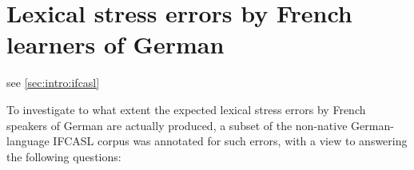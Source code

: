 %
%
\chapter{Lexical stress errors by French learners of German}
\label{chap:lexstress}



%	
	

	 see \cref{sec:intro:ifcasl}

	To investigate to what extent the expected lexical stress errors by French speakers of German are actually produced, a subset of the non-native German-language IFCASL corpus was annotated for such errors, with a view to answering the following questions:

